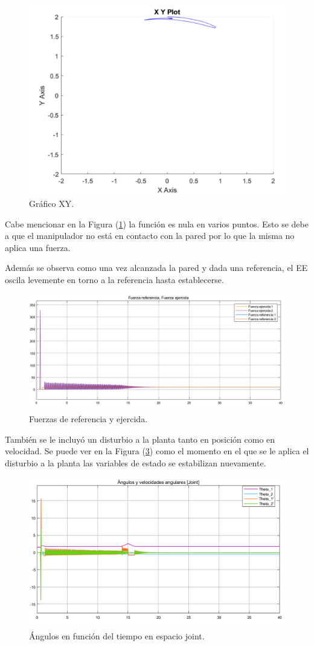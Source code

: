 \begin{figure}[H]
	\centering
	\includegraphics[width=0.5\linewidth]{ImagenesControl de fuerza no lineal/2_3_c}
	\caption{Gráfico XY.}	
	\label{fig:axy_f}
\end{figure}

Cabe mencionar en la Figura (\ref{fig:axy_f}) la función es nula en varios puntos. Esto se debe a que el manipulador no está en contacto con la pared por lo que la misma no aplica una fuerza.

Además se observa como una vez alcanzada la pared y dada una referencia, el EE oscila levemente en torno a la referencia hasta establecerse.

\begin{figure}[H]
	\centering
	\includegraphics[width=0.8\linewidth]{ImagenesControl de fuerza no lineal/2_3_e}
	\caption{Fuerzas de referencia y ejercida.}	
	\label{fig:af_f}
\end{figure}

También se le incluyó un disturbio a la planta tanto en posición como en velocidad. Se puede ver en la Figura (\ref{fig:athetasd_f}) como el momento en el que se le aplica el disturbio a la planta las variables de estado se estabilizan nuevamente.
\begin{figure}[H]
	\centering
	\includegraphics[width=0.8\linewidth]{ImagenesControl de fuerza no lineal/2_3_f_a}
	\caption{Ángulos en función del tiempo en espacio joint.}	
	\label{fig:athetasd_f}
\end{figure}

